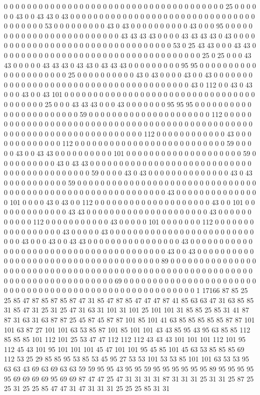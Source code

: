0 0 0 0 0 0 0 0 0 0 0 0 0 0 0 0 0 0 0 0 0 0 0 0 0 0 0 0 0 0 0 0 0 0 0 0 0 0 25 0 0 0 0 0 0 43 0 0 43 43 0 43 0 0 0 0 0 0 0 0 0 0 0 0 0 0 0 0 0 0 0 0 0 0 0 0 0 0 0 0 0 0 0 0 0 0 0 0 0 0 0 53 0 0 0 0 0 0 0 0 0 43 0 43 0 0 0 0 0 0 0 0 0 0 43 0 0 0 95 0 0 0 0 0 0 0 0 0 0 0 0 0 0 0 0 0 0 0 0 0 0 0 0 0 43 43 43 43 0 0 0 0 43 43 43 43 0 43 0 0 0 0 0 0 0 0 0 0 0 0 0 0 0 0 0 0 0 0 0 0 0 0 0 0 0 0 0 0 0 0 0 53 0 25 43 43 0 0 0 43 43 0 0 0 0 0 0 0 0 0 0 0 0 0 0 0 0 0 0 0 0 0 0 0 0 0 0 0 0 0 0 0 0 0 0 0 25 0 25 0 0 0 43 43 0 0 0 0 0 43 43 43 0 43 43 0 43 43 43 0 0 0 0 0 0 0 0 0 95 95 0 0 0 0 0 0 0 0 0 0 0 0 0 0 0 0 0 0 0 0 0 25 0 0 0 0 0 0 0 0 0 0 43 0 43 0 0 0 0 43 0 0 43 0 0 0 0 0 0 0 0 0 0 0 0 0 0 0 0 0 0 0 0 0 0 0 0 0 0 0 0 0 0 0 0 0 0 0 0 0 0 0 43 0 112 0 0 43 0 43 0 0 0 43 0 0 43 101 0 0 0 0 0 0 0 0 0 0 0 0 0 0 0 0 0 0 0 0 0 0 0 0 0 0 0 0 0 0 0 0 0 0 0 0 0 0 0 0 25 0 0 0 43 43 43 0 0 0 43 0 0 0 0 0 0 0 95 95 95 0 0 0 0 0 0 0 0 0 0 0 0 0 0 0 0 0 0 0 0 0 0 0 59 0 0 0 0 0 0 0 0 0 0 0 0 0 0 0 0 0 0 0 0 0 112 0 0 0 0 0 0 0 0 0 0 0 0 0 0 0 0 0 0 0 0 0 0 0 0 0 0 0 0 0 0 0 0 0 0 0 0 0 0 0 0 0 0 0 0 0 0 0 0 0 0 0 0 0 0 0 0 0 0 0 0 0 0 0 0 0 0 0 0 0 0 0 0 112 0 0 0 0 0 0 0 0 0 0 0 0 43 0 0 0 0 0 0 0 0 0 0 0 0 0 112 0 0 0 0 0 0 0 0 0 0 0 0 0 0 0 0 0 0 0 0 0 0 0 0 0 0 59 0 0 0 0 0 43 0 0 43 43 0 0 0 0 0 0 0 0 0 0 101 0 0 0 0 0 0 0 0 0 0 0 0 0 0 0 0 0 0 0 0 59 0 0 0 0 0 0 0 0 0 0 43 0 43 43 0 0 0 0 0 0 0 0 0 0 0 0 0 0 0 0 0 0 0 0 0 0 0 0 0 0 0 0 0 0 0 0 0 0 0 0 0 0 0 0 0 0 0 59 0 0 0 0 43 0 43 0 0 0 0 0 0 0 0 0 0 0 0 0 0 43 0 43 0 0 0 0 0 0 0 0 0 0 0 59 0 0 0 0 0 0 0 0 0 0 0 0 0 0 0 0 0 0 0 0 0 0 0 0 0 0 0 0 0 0 0 0 0 0 0 0 0 0 0 0 0 0 0 0 0 0 0 0 0 0 0 0 0 0 0 0 0 0 0 43 0 0 0 0 0 0 0 0 0 0 0 0 0 0 0 101 0 0 0 0 43 0 43 0 0 112 0 0 0 0 0 0 0 0 0 0 0 0 0 0 0 0 0 0 0 0 43 0 0 101 0 0 0 0 0 0 0 0 0 0 0 0 0 43 43 0 0 0 0 0 0 0 0 0 0 0 0 0 0 0 0 0 0 0 0 0 43 0 0 0 0 0 0 0 0 0 0 0 112 0 0 0 0 0 0 0 0 0 0 0 43 0 0 0 0 0 101 0 0 0 0 0 0 0 112 0 0 0 0 0 0 0 0 0 0 0 0 0 0 0 0 0 43 0 0 0 0 0 43 0 0 0 0 0 0 0 0 0 0 0 0 0 0 0 0 0 0 0 0 0 0 0 0 0 0 0 0 43 0 0 0 43 0 0 43 43 0 0 0 0 0 0 0 0 0 0 0 0 0 0 0 0 43 0 0 0 0 0 0 0 0 0 0 0 0 0 0 0 0 0 0 0 0 0 0 0 0 0 0 0 0 0 0 0 0 0 0 0 0 0 0 0 43 0 0 43 0 0 0 0 0 0 0 0 0 0 0 0 0 0 0 0 0 0 0 0 0 0 0 0 0 0 0 0 0 0 0 0 0 0 0 0 0 89 0 0 0 0 0 0 0 0 0 0 0 0 0 0 0 0 0 0 0 0 0 0 0 0 0 0 0 0 0 0 0 0 0 0 0 0 0 0 0 0 0 0 0 0 0 0 0 0 0 0 0 0 0 0 0 0 0 0 0 0 0 0 0 0 0 0 0 0 0 0 0 0 0 0 0 0 0 69 0 0 0 0 0 0 0 0 0 0 0 0 0 0 0 0 0 0 0 0 0 0 0 0 0 0 0 0 0 0 0 0 0 0 0 0 0 0 0 0 0 0 0 0 0 0 0 0 0 0 0 0 0 0 0 0 1 17166 87 85 25 25 85 47 87 85 87 85 87 47 31 85 47 87 85 47 47 47 87 41 85 63 63 47 31 63 85 85 31 85 47 31 25 31 25 47 31 63 31 101 31 101 25 101 101 31 85 85 25 85 31 41 87 87 31 63 31 63 87 87 25 45 87 45 87 87 101 85 101 41 63 85 85 85 85 85 87 87 101 101 63 87 27 101 101 63 53 85 87 101 85 101 101 43 43 85 95 43 95 63 85 85 112 85 85 85 101 112 101 25 53 47 47 112 112 112 43 43 43 101 101 101 112 101 95 112 45 43 101 95 101 101 101 45 47 101 101 95 45 85 101 45 63 53 85 85 85 69 112 53 25 29 85 85 95 53 85 53 45 95 27 53 53 101 53 53 85 101 101 63 53 53 95 63 63 43 69 63 69 63 63 59 59 95 95 43 95 95 59 95 95 95 95 95 95 89 95 95 95 95 95 69 69 69 69 95 69 69 87 47 47 25 47 31 31 31 31 87 31 31 31 25 31 31 25 87 25 25 31 25 25 85 47 47 31 47 31 31 31 25 25 25 85 31 31 